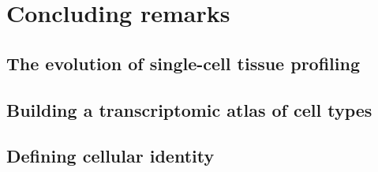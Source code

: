 \chapter{Concluding remarks} \label{chap:conc}

\ifpdf
    \graphicspath{{Chapter5/Figs/Raster/}{Chapter5/Figs/PDF/}{Chapter5/Figs/}}
\else
    \graphicspath{{Chapter5/Figs/Vector/}{Chapter5/Figs/}}
\fi


\section{The evolution of single-cell tissue profiling}
\label{section_prof}


\section{Building a transcriptomic atlas of cell types}
\label{section_atlas}


\section{Defining cellular identity}
\label{section_ident}


